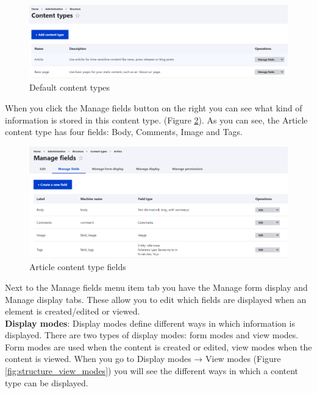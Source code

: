 \begin{figure}[H]
    \centering
    \includegraphics[width=1\linewidth]{img/ch4/admin_content_types}
    \caption{Default content types}
    \label{fig:admin_content_types}
\end{figure}


When you click the Manage fields button on the right you can see what kind of information is stored in this content type. (Figure \ref{fig:content_article_fields}). As you can see, the Article content type has four fields: Body, Comments, Image and Tags.

\begin{figure}[H]
    \centering
    \includegraphics[width=1\linewidth]{img/ch4/content_article_fields}
    \caption{Article content type fields}
    \label{fig:content_article_fields}
\end{figure}

Next to the Manage fields menu item tab you have the Manage form display and Manage display tabs. These allow you to edit which fields are displayed when an element is created/edited or viewed.
\\
\textbf{Display modes}: Display modes define different ways in which information is displayed. There are two types of display modes: form modes and view modes. Form modes are used when the content is created or edited, view modes when the content is viewed. When you go to Display modes → View modes (Figure \ref{fig:structure_view_modes}) you will see the different ways in which a content type can be displayed.

